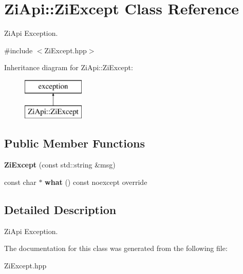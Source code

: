 \hypertarget{classZiApi_1_1ZiExcept}{}\section{Zi\+Api\+::Zi\+Except Class Reference}
\label{classZiApi_1_1ZiExcept}


Zi\+Api Exception.  




{\ttfamily \#include $<$Zi\+Except.\+hpp$>$}

Inheritance diagram for Zi\+Api\+::Zi\+Except\+:\begin{figure}[H]
\begin{center}
\leavevmode
\includegraphics[height=2.000000cm]{classZiApi_1_1ZiExcept}
\end{center}
\end{figure}
\subsection*{Public Member Functions}
\begin{DoxyCompactItemize}
\item 
\mbox{\label{classZiApi_1_1ZiExcept_ade964d4f6839a6ee9520d31db9fecc42}} 
{\bfseries Zi\+Except} (const std\+::string \&msg)
\item 
\mbox{\label{classZiApi_1_1ZiExcept_aa0cec723bcc93a164c830d7c6a5e7639}} 
const char $\ast$ {\bfseries what} () const noexcept override
\end{DoxyCompactItemize}


\subsection{Detailed Description}
Zi\+Api Exception. 

The documentation for this class was generated from the following file\+:\begin{DoxyCompactItemize}
\item 
Zi\+Except.\+hpp\end{DoxyCompactItemize}
